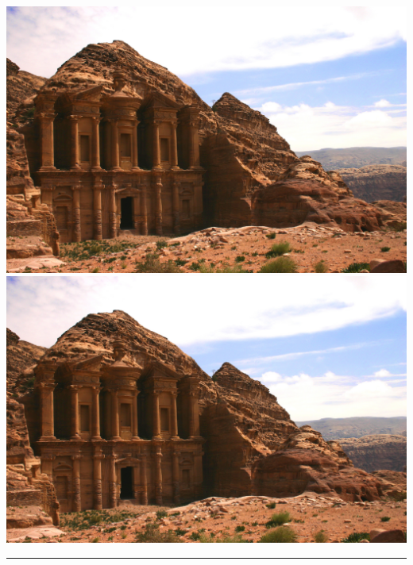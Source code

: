 \documentclass{book}
\makeatletter
\newcommand{\cleartoevenpage}{%
  \clearpage%
  \ifoddpage\c@page\hbox{}\clearpage\fi}
\makeatother
\begin{document}
\cleartoevenpage
\includegraphics[height=0.95\textheight]{petra}
\newpage
\hspace*{-\textwidth}\includegraphics[height=0.95\textheight]{petra}\hspace{1em}
\parbox[b]{0.25\textwidth}{\lipsum*[1-2]\par \rule{1pt}{0pt}}
\end{document}
